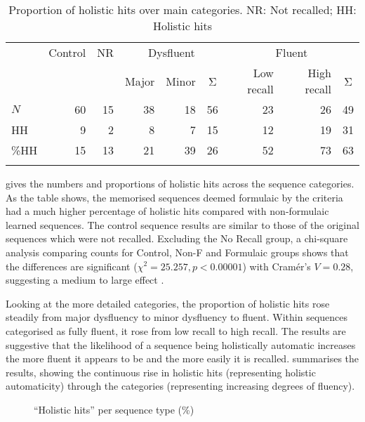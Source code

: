 \documentclass[output=paper]{langscibook}
\begin{document}
\begin{table}
\begin{tabular}{lrrrrcrrc}
\lsptoprule
    & Control & NR & \multicolumn{3}{c}{Dysfluent} & \multicolumn{3}{c}{Fluent}\\\cmidrule(lr){4-6}\cmidrule(lr){7-9}
    &         &              & Major & Minor & Σ             & Low recall & High recall & Σ\\\midrule
$N$ & 60      & 15           & 38 & 18 & 56                  & 23 & 26 & 49\\ 
HH  & 9       & 2            & 8  & 7  & 15                  & 12 & 19 & 31\\
\%HH& 15      & 13           & 21 & 39 & 26                  & 52 & 73 & 63\\\lspbottomrule
\end{tabular}
\caption{Proportion of holistic hits over main categories. NR: Not recalled; HH: Holistic hits \label{tab:cutler:6}}
\end{table}

 gives the numbers and proportions of holistic hits across the sequence categories. As the table shows, the memorised sequences deemed formulaic by the criteria had a much higher percentage of holistic hits compared with non-formulaic learned sequences. The control sequence results are similar to those of the original sequences which were not recalled. Excluding the No Recall group, a chi-square analysis comparing counts for Control, Non-F and Formulaic groups shows that the differences are significant ($\chi^2=25.257, p<0.00001$) with Cramér's  $V=0.28$, suggesting a medium to large effect \citep{Cohen1988}.

Looking at the more detailed categories, the proportion of holistic hits rose steadily from major dysfluency to minor dysfluency to fluent. Within sequences categorised as fully fluent, it rose from low recall to high recall. The results are suggestive that the likelihood of a sequence being holistically automatic increases the more fluent it appears to be and the more easily it is recalled.  summarises the results, showing the continuous rise in holistic hits (representing holistic automaticity) through the categories (representing increasing degrees of fluency).

\begin{figure}
\caption{``Holistic hits'' per sequence type (\%)\label{fig:cutler:3}}
\end{figure}
\end{document}
